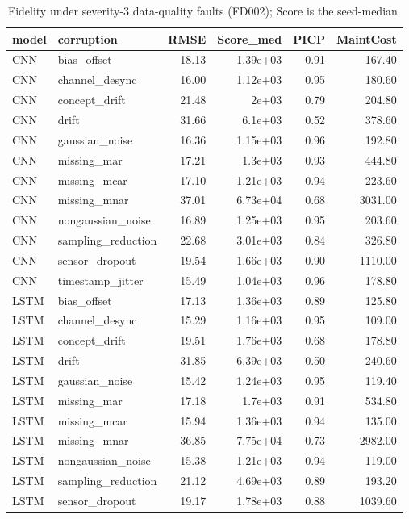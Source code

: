 \begin{table}
\caption{Fidelity under severity-3 data-quality faults (FD002); Score is the seed-median.}
\label{tab:sev3_FD002}
\begin{tabular}{llrrrr}
\toprule  %
model & corruption & RMSE & Score\_med & PICP & MaintCost \\
\midrule
CNN & bias\_offset & 18.13 & 1.39e+03 & 0.91 & 167.40 \\
CNN & channel\_desync & 16.00 & 1.12e+03 & 0.95 & 180.60 \\
CNN & concept\_drift & 21.48 & 2e+03 & 0.79 & 204.80 \\
CNN & drift & 31.66 & 6.1e+03 & 0.52 & 378.60 \\
CNN & gaussian\_noise & 16.36 & 1.15e+03 & 0.96 & 192.80 \\
CNN & missing\_mar & 17.21 & 1.3e+03 & 0.93 & 444.80 \\
CNN & missing\_mcar & 17.10 & 1.21e+03 & 0.94 & 223.60 \\
CNN & missing\_mnar & 37.01 & 6.73e+04 & 0.68 & 3031.00 \\
CNN & nongaussian\_noise & 16.89 & 1.25e+03 & 0.95 & 203.60 \\
CNN & sampling\_reduction & 22.68 & 3.01e+03 & 0.84 & 326.80 \\
CNN & sensor\_dropout & 19.54 & 1.66e+03 & 0.90 & 1110.00 \\
CNN & timestamp\_jitter & 15.49 & 1.04e+03 & 0.96 & 178.80 \\
LSTM & bias\_offset & 17.13 & 1.36e+03 & 0.89 & 125.80 \\
LSTM & channel\_desync & 15.29 & 1.16e+03 & 0.95 & 109.00 \\
LSTM & concept\_drift & 19.51 & 1.76e+03 & 0.68 & 178.80 \\
LSTM & drift & 31.85 & 6.39e+03 & 0.50 & 240.60 \\
LSTM & gaussian\_noise & 15.42 & 1.24e+03 & 0.95 & 119.40 \\
LSTM & missing\_mar & 17.18 & 1.7e+03 & 0.91 & 534.80 \\
LSTM & missing\_mcar & 15.94 & 1.36e+03 & 0.94 & 135.00 \\
LSTM & missing\_mnar & 36.85 & 7.75e+04 & 0.73 & 2982.00 \\
LSTM & nongaussian\_noise & 15.38 & 1.21e+03 & 0.94 & 119.00 \\
LSTM & sampling\_reduction & 21.12 & 4.69e+03 & 0.89 & 193.20 \\
LSTM & sensor\_dropout & 19.17 & 1.78e+03 & 0.88 & 1039.60 \\

\end{tabular}
\end{table}
